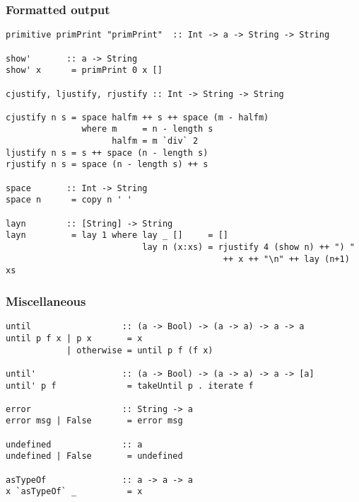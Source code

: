 \subsubsection*{Formatted output}
\begin{verbatim}
primitive primPrint "primPrint"  :: Int -> a -> String -> String

show'       :: a -> String
show' x      = primPrint 0 x []

cjustify, ljustify, rjustify :: Int -> String -> String

cjustify n s = space halfm ++ s ++ space (m - halfm)
               where m     = n - length s
                     halfm = m `div` 2
ljustify n s = s ++ space (n - length s)
rjustify n s = space (n - length s) ++ s

space       :: Int -> String
space n      = copy n ' '

layn        :: [String] -> String
layn         = lay 1 where lay _ []     = []
                           lay n (x:xs) = rjustify 4 (show n) ++ ") "
                                           ++ x ++ "\n" ++ lay (n+1) xs
\end{verbatim}
\subsubsection*{Miscellaneous}
\begin{verbatim}
until                  :: (a -> Bool) -> (a -> a) -> a -> a
until p f x | p x       = x
            | otherwise = until p f (f x)

until'                 :: (a -> Bool) -> (a -> a) -> a -> [a]
until' p f              = takeUntil p . iterate f

error                  :: String -> a
error msg | False       = error msg

undefined              :: a
undefined | False       = undefined

asTypeOf               :: a -> a -> a
x `asTypeOf` _          = x
\end{verbatim}
